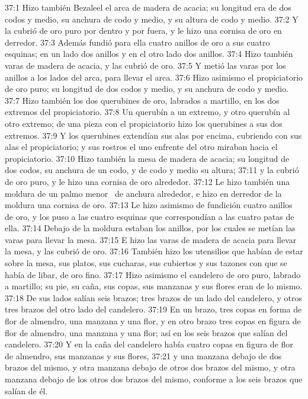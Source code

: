 37:1 Hizo también Bezaleel el arca de madera de acacia; su longitud era de dos codos y medio, su anchura de codo y medio, y su altura de codo y medio. 
37:2 Y la cubrió de oro puro por dentro y por fuera, y le hizo una cornisa de oro en derredor. 
37:3 Además fundió para ella cuatro anillos de oro a sus cuatro esquinas; en un lado dos anillos y en el otro lado dos anillos. 
37:4 Hizo también varas de madera de acacia, y las cubrió de oro. 
37:5 Y metió las varas por los anillos a los lados del arca, para llevar el arca. 
37:6 Hizo asimismo el propiciatorio de oro puro; su longitud de dos codos y medio, y su anchura de codo y medio. 
37:7 Hizo también los dos querubines de oro, labrados a martillo, en los dos extremos del propiciatorio. 
37:8 Un querubín a un extremo, y otro querubín al otro extremo; de una pieza con el propiciatorio hizo los querubines a sus dos extremos. 
37:9 Y los querubines extendían sus alas por encima, cubriendo con sus alas el propiciatorio; y sus rostros el uno enfrente del otro miraban hacia el propiciatorio. 
37:10 Hizo también la mesa de madera de acacia; su longitud de dos codos, su anchura de un codo, y de codo y medio su altura; 
37:11 y la cubrió de oro puro, y le hizo una cornisa de oro alrededor. 
37:12 Le hizo también una moldura de un palmo menor  de anchura alrededor, e hizo en derredor de la moldura una cornisa de oro. 
37:13 Le hizo asimismo de fundición cuatro anillos de oro, y los puso a las cuatro esquinas que correspondían a las cuatro patas de ella. 
37:14 Debajo de la moldura estaban los anillos, por los cuales se metían las varas para llevar la mesa. 
37:15 E hizo las varas de madera de acacia para llevar la mesa, y las cubrió de oro. 
37:16 También hizo los utensilios que habían de estar sobre la mesa, sus platos, sus cucharas, sus cubiertos y sus tazones con que se había de libar, de oro fino. 
37:17 Hizo asimismo el candelero de oro puro, labrado a martillo; su pie, su caña, sus copas, sus manzanas y sus flores eran de lo mismo. 
37:18 De sus lados salían seis brazos; tres brazos de un lado del candelero, y otros tres brazos del otro lado del candelero. 
37:19 En un brazo, tres copas en forma de flor de almendro, una manzana y una flor, y en otro brazo tres copas en figura de flor de almendro, una manzana y una flor; así en los seis brazos que salían del candelero. 
37:20 Y en la caña del candelero había cuatro copas en figura de flor de almendro, sus manzanas y sus flores, 
37:21 y una manzana debajo de dos brazos del mismo, y otra manzana debajo de otros dos brazos del mismo, y otra manzana debajo de los otros dos brazos del mismo, conforme a los seis brazos que salían de él. 
